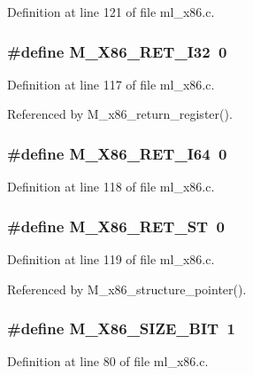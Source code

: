 Definition at line 121 of file ml\_\-x86.c.
\subsubsection{\setlength{\rightskip}{0pt plus 5cm}\#define M\_\-X86\_\-RET\_\-I32~0}\label{ml__x86_8c_2f14c035b13d8141c836f813fd868a77}




Definition at line 117 of file ml\_\-x86.c.

Referenced by M\_\-x86\_\-return\_\-register().
\subsubsection{\setlength{\rightskip}{0pt plus 5cm}\#define M\_\-X86\_\-RET\_\-I64~0}\label{ml__x86_8c_4d49e594dce01b4a31b680dd47af5913}




Definition at line 118 of file ml\_\-x86.c.
\subsubsection{\setlength{\rightskip}{0pt plus 5cm}\#define M\_\-X86\_\-RET\_\-ST~0}\label{ml__x86_8c_23b348614fe1136a347e44c5cfd5d68b}




Definition at line 119 of file ml\_\-x86.c.

Referenced by M\_\-x86\_\-structure\_\-pointer().
\subsubsection{\setlength{\rightskip}{0pt plus 5cm}\#define M\_\-X86\_\-SIZE\_\-BIT~1}\label{ml__x86_8c_ccec9c11fef4d459ff0440737aec8dc1}




Definition at line 80 of file ml\_\-x86.c.
